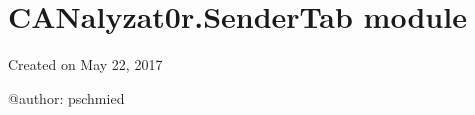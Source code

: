 \documentclass[letterpaper,10pt,english]{sphinxmanual}
\begin{document}
\begin{fulllineitems}
\begin{fulllineitems}
\begin{quote}
\begin{description}
\end{description}\end{quote}

\end{fulllineitems}


\end{fulllineitems}



\section{CANalyzat0r.SenderTab module}
\label{\detokenize{src:canalyzat0r-sendertab-module}}\label{\detokenize{src:module-src.SenderTab}}
Created on May 22, 2017

@author: pschmied
\end{document}

